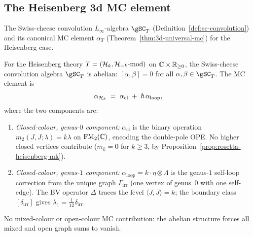 \subsection{The Heisenberg 3d MC element}
\label{subsec:rosetta-3d-mc}

The Swiss-cheese convolution $L_\infty$-algebra $\gSC_T$ (Definition~\ref{def:sc-convolution}) and its canonical MC element $\alpha_T$ (Theorem~\ref{thm:3d-universal-mc}) for the Heisenberg case.

\begin{theorem}
\label{thm:rosetta-3d-mc}
For the Heisenberg theory $T = (\mathcal{H}_k, \mathcal{H}_{-k}\text{-mod})$ on
$\mathbb{C} \times \mathbb{R}_{\ge 0}$, the Swiss-cheese convolution algebra
$\gSC_T$ is abelian: $[\alpha,\beta] = 0$ for all
$\alpha, \beta \in \gSC_T$. The MC element is
\begin{equation}\label{eq:alpha-heisenberg}
\alpha_{\mathcal{H}_k}
\;=\;
\alpha_{\mathrm{cl}}
\;+\;
\hbar\,\alpha_{\mathrm{loop}},
\end{equation}
where the two components are:
\begin{enumerate}[label=\textup{(\roman*)}]
\item \emph{Closed-colour, genus-$0$ component:}
 $\alpha_{\mathrm{cl}}$ is the binary operation
 $m_2(J,J;\lambda) = k\lambda$ on $\mathrm{FM}_2(\mathbb{C})$, encoding the
 double-pole OPE\@. No higher closed vertices contribute
 ($m_k = 0$ for $k \ge 3$, by
 Proposition~\textup{\ref{prop:rosetta-heisenberg-mk}}).
\item \emph{Closed-colour, genus-$1$ component:}
 $\alpha_{\mathrm{loop}} = k \cdot \eta \otimes \Lambda$ is the
 genus-$1$ self-loop correction from the unique graph
 $\Gamma_{\mathrm{irr}}$ \textup{(}one vertex of genus~$0$ with
 one self-edge\textup{)}. The BV operator $\Delta$ traces the
 level $\langle J, J \rangle = k$; the boundary class
 $[\delta_{\mathrm{irr}}]$ gives
 $\lambda_1 = \tfrac{1}{12}\delta_{\mathrm{irr}}$.
\end{enumerate}
No mixed-colour or open-colour MC contribution: the abelian structure forces all mixed and open graph sums to vanish.
\end{theorem}

